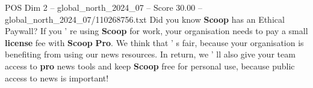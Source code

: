 \begin{textsample}{POS Dim 2 – global\_north\_2024\_07 – Score 30.00 – global\_north\_2024\_07/110268756.txt}
Did you know \textbf{Scoop} has an Ethical Paywall?
If you ' re using \textbf{Scoop} for work, your organisation needs to pay a small \textbf{license} fee with \textbf{Scoop} \textbf{Pro}.
We think that ' s fair, because your organisation is benefiting from using our news resources.
In return, we ' ll also give your team access to \textbf{pro} news tools and keep \textbf{Scoop} free for personal use, because public access to news is important!

\end{textsample}
